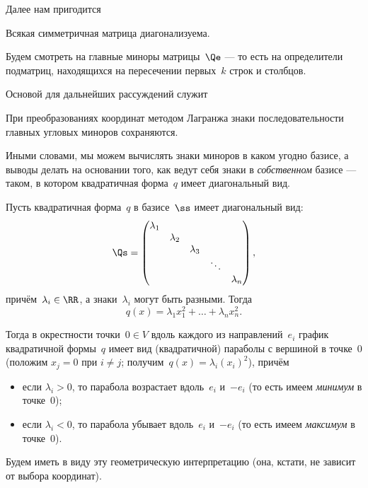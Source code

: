 Далее нам пригодится
\begin{lemma}
	Всякая симметричная матрица диагонализуема.
\end{lemma}

Будем смотреть на главные миноры матрицы~$\Qe$ --- то есть на определители подматриц, находящихся на пересечении первых~$k$ строк и столбцов.

Основой для дальнейших рассуждений служит
\begin{lemma}
	\label{<+label+>}
	При преобразованиях координат методом Лагранжа знаки последовательности главных угловых миноров сохраняются.
\end{lemma}

Иными словами, мы можем вычислять знаки миноров в каком угодно базисе, а выводы делать на основании того, как ведут себя знаки в \emph{собственном} базисе --- таком, в котором квадратичная форма~$q$ имеет диагональный вид.

Пусть квадратичная форма~$q$ в базисе~$\ss$ имеет диагональный вид:
\[
	\Qs =
	\begin{pmatrix}
		\lambda_1 \\
		& \lambda_2 \\
		&& \lambda_3 \\
		&&& \ddots \\
		&&&& \lambda_n
	\end{pmatrix}
	,
\]
причём~$\lambda_i \in \RR$, а знаки~$\lambda_i$ могут быть разными.
Тогда
\[
	q(x) = \lambda_1 x_1^2 + \dots + \lambda_n x_n^2
	.
\]

Тогда в окрестности точки~$0 \in V$ вдоль каждого из направлений~$e_i$ график квадратичной формы~$q$ имеет вид (квадратичной) параболы с вершиной в точке~$0$ (положим $x_j = 0$ при $i \neq j$; получим~$q(x) = \lambda_i (x_i)^2$), причём
\begin{itemize}
	\item если $\lambda_i > 0$, то парабола возрастает вдоль~$e_i$ и~$-e_i$ (то есть имеем \emph{минимум} в точке~$0$);
	\item если $\lambda_i < 0$, то парабола убывает вдоль~$e_i$ и~$-e_i$ (то есть имеем \emph{максимум} в точке~$0$).
\end{itemize}
Будем иметь в виду эту геометрическую интерпретацию (она, кстати, не зависит от выбора координат).

